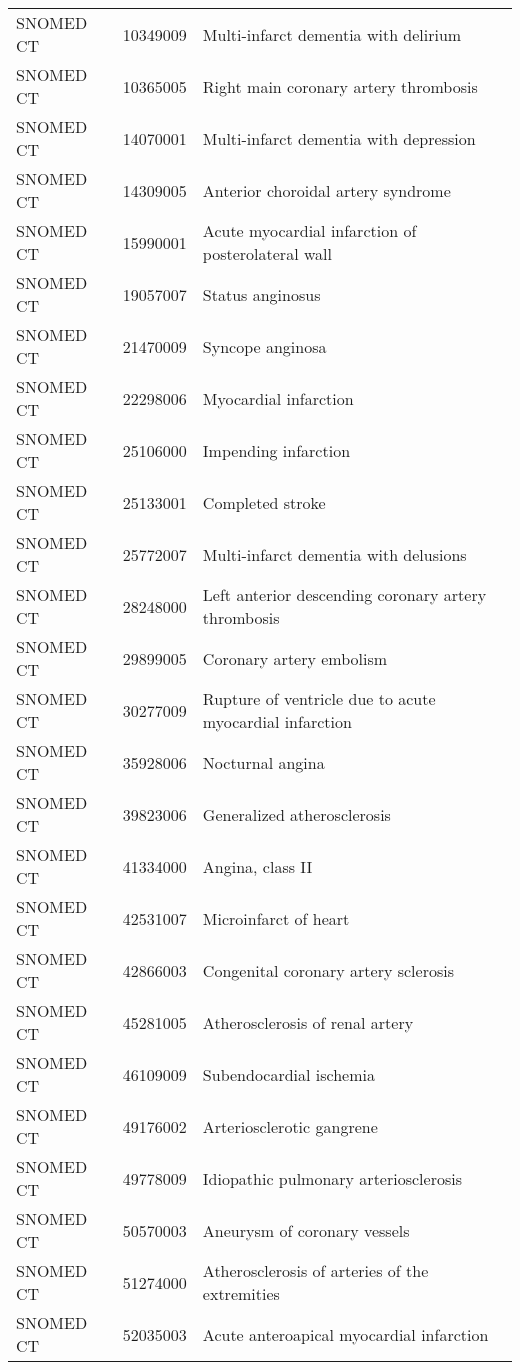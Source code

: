 \begin{longtable}{p{}p{}p{}}
  SNOMED CT & 10349009 & Multi-infarct dementia with delirium \\ 
  SNOMED CT & 10365005 & Right main coronary artery thrombosis \\ 
  SNOMED CT & 14070001 & Multi-infarct dementia with depression \\ 
  SNOMED CT & 14309005 & Anterior choroidal artery syndrome \\ 
  SNOMED CT & 15990001 & Acute myocardial infarction of posterolateral wall \\ 
  SNOMED CT & 19057007 & Status anginosus \\ 
  SNOMED CT & 21470009 & Syncope anginosa \\ 
  SNOMED CT & 22298006 & Myocardial infarction \\ 
  SNOMED CT & 25106000 & Impending infarction \\ 
  SNOMED CT & 25133001 & Completed stroke \\ 
  SNOMED CT & 25772007 & Multi-infarct dementia with delusions \\ 
  SNOMED CT & 28248000 & Left anterior descending coronary artery thrombosis \\ 
  SNOMED CT & 29899005 & Coronary artery embolism \\ 
  SNOMED CT & 30277009 & Rupture of ventricle due to acute myocardial infarction \\ 
  SNOMED CT & 35928006 & Nocturnal angina \\ 
  SNOMED CT & 39823006 & Generalized atherosclerosis \\ 
  SNOMED CT & 41334000 & Angina, class II \\ 
  SNOMED CT & 42531007 & Microinfarct of heart \\ 
  SNOMED CT & 42866003 & Congenital coronary artery sclerosis \\ 
  SNOMED CT & 45281005 & Atherosclerosis of renal artery \\ 
  SNOMED CT & 46109009 & Subendocardial ischemia \\ 
  SNOMED CT & 49176002 & Arteriosclerotic gangrene \\ 
  SNOMED CT & 49778009 & Idiopathic pulmonary arteriosclerosis \\ 
  SNOMED CT & 50570003 & Aneurysm of coronary vessels \\ 
  SNOMED CT & 51274000 & Atherosclerosis of arteries of the extremities \\ 
  SNOMED CT & 52035003 & Acute anteroapical myocardial infarction \\ 

\end{longtable}
